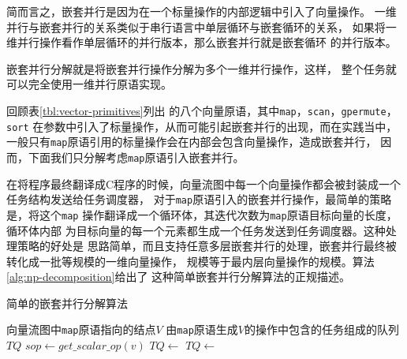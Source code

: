 简而言之，嵌套并行是因为在一个标量操作的内部逻辑中引入了向量操作。
一维并行与嵌套并行的关系类似于串行语言中单层循环与嵌套循环的关系，
如果将一维并行操作看作单层循环的并行版本，那么嵌套并行就是嵌套循环
的并行版本。
\begin{quotation}
\end{quotation}

嵌套并行分解就是将嵌套并行操作分解为多个一维并行操作，这样，
整个任务就可以完全使用一维并行原语实现。

回顾表\ref{tbl:vector-primitives}列出
的八个向量原语，其中\texttt{map}，\texttt{scan}，\texttt{gpermute}，\texttt{sort}
在参数中引入了标量操作，从而可能引起嵌套并行的出现，而在实践当中，
一般只有\texttt{map}原语引用的标量操作会在内部会包含向量操作，造成嵌套并行，
因而，下面我们只分解考虑\texttt{map}原语引入嵌套并行。

在将程序最终翻译成C程序的时候，向量流图中每一个向量操作都会被封装成一个任务结构发送给任务调度器，
对于\texttt{map}原语引入的嵌套并行操作，最简单的策略是，将这个\texttt{map}
操作翻译成一个循环体，其迭代次数为\texttt{map}原语目标向量的长度，循环体内部
为目标向量的每一个元素都生成一个任务发送到任务调度器。这种处理策略的好处是
思路简单，而且支持任意多层嵌套并行的处理，嵌套并行最终被转化成一批等规模的一维向量操作，
规模等于最内层向量操作的规模。算法\ref{alg:np-decomposition}给出了
这种简单嵌套并行分解算法的正规描述。
\begin{algorithm}
  \caption{简单的嵌套并行分解算法}
  \label{alg:np-decomposition}
  \begin{algorithmic}[1]
    \Require 向量流图中\texttt{map}原语指向的结点$V$
    \Ensure 由\texttt{map}原语生成$V$的操作中包含的任务组成的队列$TQ$
    \State $sop \leftarrow get\_scalar\_op(v)$
    \State $TQ \leftarrow$ 
    \EndFor
    \Else
    \State $TQ \leftarrow$ 
    \EndIf
    \State {}
    \EndFunction
  \end{algorithmic}
\end{algorithm}

